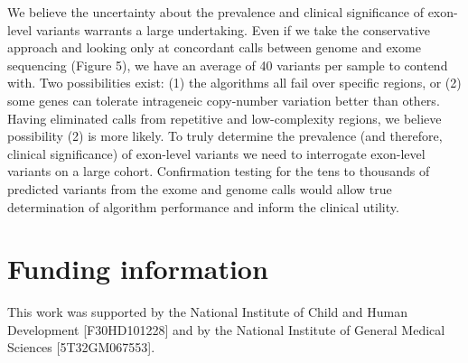 \documentclass{article}\usepackage[]{graphicx}\usepackage[]{color}
\begin{document}
We believe the uncertainty about the prevalence and clinical significance of exon-level variants warrants a large undertaking.
Even if we take the conservative approach and looking only at concordant calls between genome and exome sequencing (Figure 5), we have an average of 40 variants per sample to contend with.
Two possibilities exist: (1) the algorithms all fail over specific regions, or (2) some genes can tolerate intrageneic copy-number variation better than others.
Having eliminated calls from repetitive and low-complexity regions, we believe possibility (2) is more likely.
To truly determine the prevalence (and therefore, clinical significance) of exon-level variants we need to interrogate exon-level variants on a large cohort.
Confirmation testing for the tens to thousands of predicted variants from the exome and genome calls would allow true determination of algorithm performance and inform the clinical utility.

\section{Funding information}

This work was supported by the National Institute of Child and Human Development [F30HD101228] and by the National Institute of General Medical Sciences [5T32GM067553].




\end{document}
